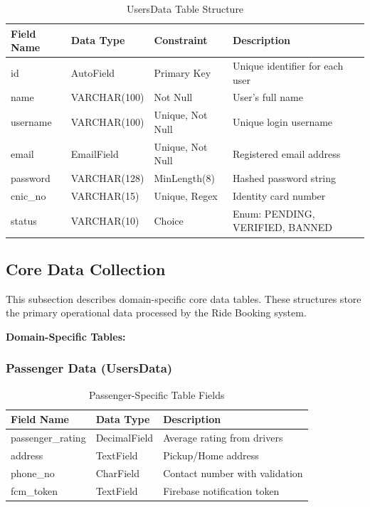 \begin{table}[H]
\centering
\caption{UsersData Table Structure}
\renewcommand{\arraystretch}{1.5}
\begin{tabular}{|p{3cm}|p{3.5cm}|p{3cm}|p{5cm}|}
\hline
\textbf{Field Name} & \textbf{Data Type} & \textbf{Constraint} & \textbf{Description} \\
\hline
id & AutoField & Primary Key & Unique identifier for each user \\
\hline
name & VARCHAR(100) & Not Null & User's full name \\
\hline
username & VARCHAR(100) & Unique, Not Null & Unique login username \\
\hline
email & EmailField & Unique, Not Null & Registered email address \\
\hline
password & VARCHAR(128) & MinLength(8) & Hashed password string \\
\hline
cnic\_no & VARCHAR(15) & Unique, Regex & Identity card number \\
\hline
status & VARCHAR(10) & Choice & Enum: PENDING, VERIFIED, BANNED \\
\hline
\end{tabular}
\end{table}

\subsection{Core Data Collection}

This subsection describes domain-specific core data tables. These structures store the primary operational data processed by the Ride Booking system.

\textbf{Domain-Specific Tables:}

\subsubsection{Passenger Data (UsersData)}
\begin{table}[H]
\centering
\caption{Passenger-Specific Table Fields}
\renewcommand{\arraystretch}{1.5}
\begin{tabular}{|p{3cm}|p{3.5cm}|p{7cm}|}
\hline
\textbf{Field Name} & \textbf{Data Type} & \textbf{Description} \\
\hline
passenger\_rating & DecimalField & Average rating from drivers \\
\hline
address & TextField & Pickup/Home address \\
\hline
phone\_no & CharField & Contact number with validation \\
\hline
fcm\_token & TextField & Firebase notification token \\
\hline
\end{tabular}
\end{table}

